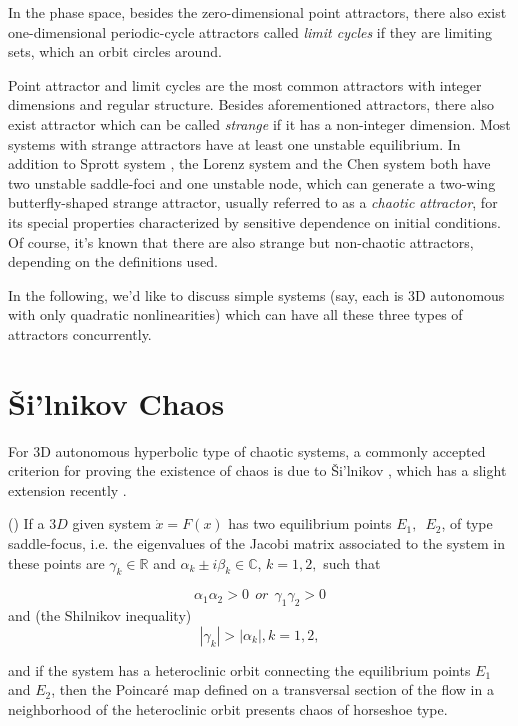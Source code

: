 In the phase space, besides the zero-dimensional point attractors, there also exist one-dimensional periodic-cycle 
attractors called \emph{limit cycles} if they are limiting sets, which an orbit circles around.

Point attractor and limit cycles are the most common attractors with integer dimensions and regular structure. 
Besides aforementioned attractors, there also exist attractor which can be called \emph{strange} if it has a non-integer
dimension. Most systems with strange attractors have at least one unstable equilibrium. 
In addition to Sprott system \cite{Sprott1993,Sprott1994,Sprott1997,Sprott2000},
the Lorenz system \cite{Lorenz1963} and the Chen system \cite{Chen1999,Ueta2000} both have two unstable saddle-foci and
one unstable node, which can generate a two-wing butterfly-shaped strange attractor, usually referred to as 
a \emph{chaotic attractor}, for its special properties characterized by sensitive dependence on initial conditions.
Of course, it's known that there are also strange but non-chaotic attractors, depending on the definitions used.

In the following, we'd like to discuss simple systems (say, each is 3D autonomous with only quadratic
nonlinearities)\cite{Wang2013c} which can have all these three types of attractors concurrently.

\section{\v{S}i'lnikov Chaos}
\label{sec:chaosoneequi_silk}

For 3D autonomous hyperbolic type of chaotic
systems, a commonly accepted criterion for proving the existence
of chaos is due to \v{S}i'lnikov \cite{Ovsyannikov1987,Shilnikov1997,Silva1993,Sun2007,Ovsyannikov1992,Ovsyannikov1986,Shilnikov2001}, which has a slight
extension recently \cite{Chen2009}.

\begin{theorem}(\cite{Shilnikov1997,Silva1993}) If a $3D$ given system $\dot{x}=F(x)$ has two equilibrium points
$E_{1},$\ $E_{2}$, of type saddle-focus, i.e. the eigenvalues of
the Jacobi matrix associated to the system in these points are
$\gamma_{k}\in\mathbb{R}$ and $ \alpha_{k}\pm
i\beta_{k}\in\mathbb{C}$, $k=1,2,$ such that

\begin{equation}\label{horse2}
\alpha_{1}\alpha_{2}>0 \ \ or \ \ \gamma_{1}\gamma_{2}>0
\end{equation}
and (the Shilnikov inequality)
\begin{equation}\label{horse1}
|\gamma_{k}|>|\alpha_{k}|, k=1,2, \end{equation}

\noindent and if the system has a heteroclinic orbit connecting
the equilibrium points $E_{1}$ and $E_{2}$, then the Poincar\'{e}
map defined on a transversal section of the flow in a neighborhood
of the heteroclinic orbit presents chaos of horseshoe type.
\end{theorem}

